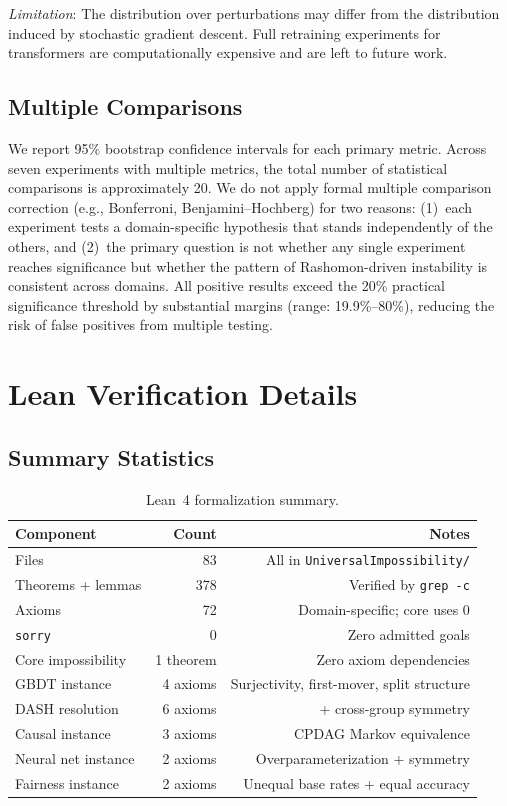 \documentclass[11pt]{article}
\begin{document}
\emph{Limitation}: The distribution over perturbations may differ from
the distribution induced by stochastic gradient descent. Full retraining
experiments for transformers are computationally expensive and are left
to future work.

\subsection{Multiple Comparisons}

We report 95\% bootstrap confidence intervals for each primary metric.
Across seven experiments with multiple metrics, the total number of
statistical comparisons is approximately 20. We do not apply formal
multiple comparison correction (e.g., Bonferroni, Benjamini--Hochberg)
for two reasons: (1)~each experiment tests a domain-specific hypothesis
that stands independently of the others, and (2)~the primary question is
not whether any single experiment reaches significance but whether the
pattern of Rashomon-driven instability is consistent across domains. All
positive results exceed the 20\% practical significance threshold by
substantial margins (range: 19.9\%--80\%), reducing the risk of false
positives from multiple testing.


\section{Lean Verification Details}
\label{sec:si-lean}

\subsection{Summary Statistics}

\begin{table}[h]
\centering
\caption{Lean~4 formalization summary.}
\label{tab:si-lean-summary}
\begin{tabular}{lrr}
\toprule
Component & Count & Notes \\
\midrule
Files & 83 & All in \texttt{UniversalImpossibility/} \\
Theorems + lemmas & 378 & Verified by \texttt{grep -c} \\
Axioms & 72 & Domain-specific; core uses 0 \\
\texttt{sorry} & 0 & Zero admitted goals \\
\midrule
Core impossibility & 1 theorem & Zero axiom dependencies \\
GBDT instance & 4 axioms & Surjectivity, first-mover, split structure \\
DASH resolution & 6 axioms & + cross-group symmetry \\
Causal instance & 3 axioms & CPDAG Markov equivalence \\
Neural net instance & 2 axioms & Overparameterization + symmetry \\
Fairness instance & 2 axioms & Unequal base rates + equal accuracy \\
\bottomrule
\end{tabular}
\end{table}
\end{document}
